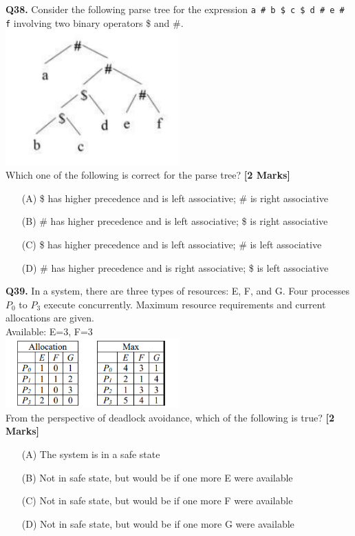 \documentclass[11pt]{article}
\newcommand{\questionb}[2]{
    \noindent\textbf{Q#2.} #1 \hfill \textbf{[2 Marks]}
}
\begin{document}
\questionb{Consider the following parse tree for the expression \texttt{a \# b \$ c \$ d \# e \# f} involving two binary operators \$ and \#.
\includegraphics[width=0.5\textwidth]{figures/38}\\
Which one of the following is correct for the parse tree?}{38}
\begin{enumerate}
    \item[(A)] \$ has higher precedence and is left associative; \# is right associative
    \item[(B)] \# has higher precedence and is left associative; \$ is right associative
    \item[(C)] \$ has higher precedence and is left associative; \# is left associative
    \item[(D)] \# has higher precedence and is right associative; \$ is left associative
\end{enumerate}
\vspace{0.5cm}

\questionb{In a system, there are three types of resources: E, F, and G. Four processes \( P_0 \) to \( P_3 \) execute concurrently. Maximum resource requirements and current allocations are given.\\
Available: E=3, F=3\\
\includegraphics[width=0.5\textwidth]{figures/39}\\
From the perspective of deadlock avoidance, which of the following is true?}{39}
\begin{enumerate}
    \item[(A)] The system is in a safe state
    \item[(B)] Not in safe state, but would be if one more E were available
    \item[(C)] Not in safe state, but would be if one more F were available
    \item[(D)] Not in safe state, but would be if one more G were available
\end{enumerate}
\vspace{0.5cm}
\end{document}
